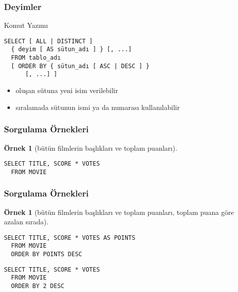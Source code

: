 \documentclass[dvipsnames]{beamer}
\theoremstyle{definition}
\theoremstyle{example}
\newtheorem{ornek}[theorem]{Örnek}
\theoremstyle{plain}
\begin{document}
\begin{frame}[fragile]
  \frametitle{Deyimler}

  \begin{block}{Komut Yazımı}
    \begin{lstlisting}
SELECT [ ALL | DISTINCT ]
  { deyim [ AS sütun_adı ] } [, ...]
  FROM tablo_adı
  [ ORDER BY { sütun_adı [ ASC | DESC ] }
      [, ...] ]
    \end{lstlisting}
  \end{block}

  \pause
  \begin{itemize}
    \item oluşan sütuna yeni isim verilebilir
    \item sıralamada sütunun ismi ya da numarası kullanılabilir
  \end{itemize}
\end{frame}

\begin{frame}[fragile]
  \frametitle{Sorgulama Örnekleri}

  \begin{ornek}[bütün filmlerin başlıkları ve toplam puanları]
    \begin{lstlisting}
SELECT TITLE, SCORE * VOTES
  FROM MOVIE
    \end{lstlisting}
  \end{ornek}
\end{frame}

\begin{frame}[fragile]
  \frametitle{Sorgulama Örnekleri}

  \begin{ornek}[bütün filmlerin başlıkları ve toplam puanları, toplam puana göre
                azalan sırada]
    \begin{lstlisting}
SELECT TITLE, SCORE * VOTES AS POINTS
  FROM MOVIE
  ORDER BY POINTS DESC
    \end{lstlisting}

    \pause
    \begin{lstlisting}
SELECT TITLE, SCORE * VOTES
  FROM MOVIE
  ORDER BY 2 DESC
    \end{lstlisting}
  \end{ornek}
\end{frame}
\end{document}
